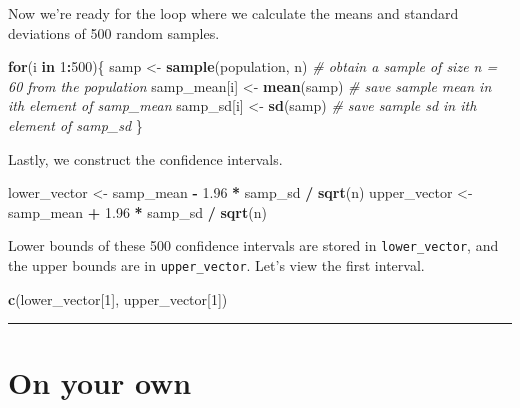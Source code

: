 \documentclass[]{book}
\newenvironment{Shaded}{\begin{snugshade}}{\end{snugshade}}
\newcommand{\KeywordTok}[1]{\textcolor[rgb]{0.13,0.29,0.53}{\textbf{#1}}}
\newcommand{\DecValTok}[1]{\textcolor[rgb]{0.00,0.00,0.81}{#1}}
\newcommand{\FloatTok}[1]{\textcolor[rgb]{0.00,0.00,0.81}{#1}}
\newcommand{\StringTok}[1]{\textcolor[rgb]{0.31,0.60,0.02}{#1}}
\newcommand{\CommentTok}[1]{\textcolor[rgb]{0.56,0.35,0.01}{\textit{#1}}}
\newcommand{\ControlFlowTok}[1]{\textcolor[rgb]{0.13,0.29,0.53}{\textbf{#1}}}
\newcommand{\OperatorTok}[1]{\textcolor[rgb]{0.81,0.36,0.00}{\textbf{#1}}}
\newcommand{\NormalTok}[1]{#1}
\theoremstyle{definition}
\theoremstyle{definition}
\theoremstyle{definition}
\theoremstyle{remark}
\begin{document}
Now we're ready for the loop where we calculate the means and standard
deviations of 500 random samples.

\begin{Shaded}
\begin{Highlighting}[]
\ControlFlowTok{for}\NormalTok{(i }\ControlFlowTok{in} \DecValTok{1}\OperatorTok{:}\DecValTok{500}\NormalTok{)\{}
\NormalTok{  samp <-}\StringTok{ }\KeywordTok{sample}\NormalTok{(population, n) }\CommentTok{# obtain a sample of size n = 60 from the population}
\NormalTok{  samp_mean[i] <-}\StringTok{ }\KeywordTok{mean}\NormalTok{(samp)    }\CommentTok{# save sample mean in ith element of samp_mean}
\NormalTok{  samp_sd[i] <-}\StringTok{ }\KeywordTok{sd}\NormalTok{(samp)        }\CommentTok{# save sample sd in ith element of samp_sd}
\NormalTok{\}}
\end{Highlighting}
\end{Shaded}

Lastly, we construct the confidence intervals.

\begin{Shaded}
\begin{Highlighting}[]
\NormalTok{lower_vector <-}\StringTok{ }\NormalTok{samp_mean }\OperatorTok{-}\StringTok{ }\FloatTok{1.96} \OperatorTok{*}\StringTok{ }\NormalTok{samp_sd }\OperatorTok{/}\StringTok{ }\KeywordTok{sqrt}\NormalTok{(n)}
\NormalTok{upper_vector <-}\StringTok{ }\NormalTok{samp_mean }\OperatorTok{+}\StringTok{ }\FloatTok{1.96} \OperatorTok{*}\StringTok{ }\NormalTok{samp_sd }\OperatorTok{/}\StringTok{ }\KeywordTok{sqrt}\NormalTok{(n)}
\end{Highlighting}
\end{Shaded}

Lower bounds of these 500 confidence intervals are stored in
\texttt{lower\_vector}, and the upper bounds are in
\texttt{upper\_vector}. Let's view the first interval.

\begin{Shaded}
\begin{Highlighting}[]
\KeywordTok{c}\NormalTok{(lower_vector[}\DecValTok{1}\NormalTok{], upper_vector[}\DecValTok{1}\NormalTok{])}
\end{Highlighting}
\end{Shaded}

\begin{center}\rule{0.5\linewidth}{\linethickness}\end{center}

\section{On your own}\label{on-your-own-4}
\end{document}

